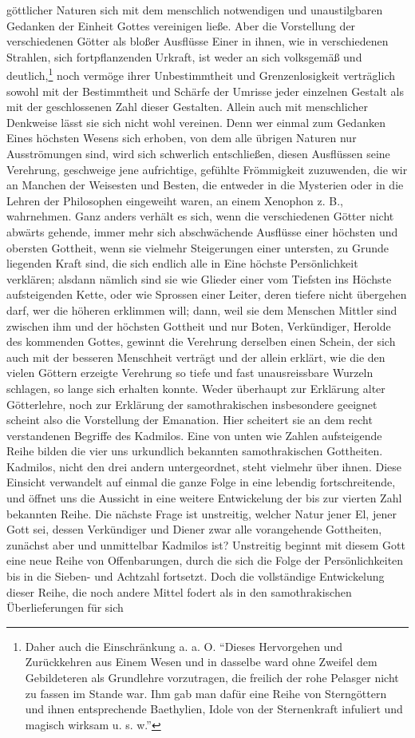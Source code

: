 \documentclass[a4paper, 11pt, oneside]{article}
\begin{document}
göttlicher Naturen sich mit dem menschlich notwendigen und unaustilgbaren Gedanken der Einheit Gottes vereinigen ließe. Aber die Vorstellung der verschiedenen Götter als bloßer Ausflüsse Einer in ihnen, wie in verschiedenen Strahlen, sich fortpflanzenden Urkraft, ist weder an sich volksgemäß und deutlich,\footnote{Daher auch die Einschränkung a. a. O. "`Dieses Hervorgehen und Zurückkehren aus Einem Wesen und in dasselbe ward ohne Zweifel dem Gebildeteren als Grundlehre vorzutragen, die freilich der rohe Pelasger nicht zu fassen im Stande war. Ihm gab man dafür eine Reihe von Sterngöttern und ihnen entsprechende Baethylien, Idole von der Sternenkraft infuliert und magisch wirksam u. s. w."'} noch vermöge ihrer Unbestimmtheit und Grenzenlosigkeit verträglich sowohl mit der Bestimmtheit und Schärfe der Umrisse jeder einzelnen Gestalt als mit der geschlossenen Zahl dieser Gestalten. Allein auch mit menschlicher Denkweise lässt sie sich nicht wohl vereinen. Denn wer einmal zum Gedanken Eines höchsten Wesens sich erhoben, von dem alle übrigen Naturen nur Ausströmungen sind, wird sich schwerlich entschließen, diesen Ausflüssen seine Verehrung, geschweige jene aufrichtige, gefühlte Frömmigkeit zuzuwenden, die wir an Manchen der Weisesten und Besten, die entweder in die Mysterien oder in die Lehren der Philosophen eingeweiht waren, an einem Xenophon z. B., wahrnehmen. Ganz anders verhält es sich, wenn die verschiedenen Götter nicht abwärts gehende, immer mehr sich abschwächende Ausflüsse einer höchsten und obersten Gottheit, wenn sie vielmehr Steigerungen einer untersten, zu Grunde liegenden Kraft sind, die sich endlich alle in Eine höchste Persönlichkeit verklären; alsdann nämlich sind sie wie Glieder einer vom Tiefsten ins Höchste aufsteigenden Kette, oder wie Sprossen einer Leiter, deren tiefere nicht übergehen darf, wer die höheren erklimmen will; dann, weil sie dem Menschen Mittler sind zwischen ihm und der höchsten Gottheit und nur Boten, Verkündiger, Herolde des kommenden Gottes, gewinnt die Verehrung derselben einen Schein, der sich auch mit der besseren Menschheit verträgt und der allein erklärt, wie die den vielen Göttern erzeigte Verehrung so tiefe und fast unausreissbare Wurzeln schlagen, so lange sich erhalten konnte. Weder überhaupt zur Erklärung alter Götterlehre, noch zur Erklärung der samothrakischen insbesondere geeignet scheint also die Vorstellung der Emanation. Hier scheitert sie an dem recht verstandenen Begriffe des Kadmilos. Eine von unten wie Zahlen aufsteigende Reihe bilden die vier uns urkundlich bekannten samothrakischen Gottheiten. Kadmilos, nicht den drei andern untergeordnet, steht vielmehr über ihnen. Diese Einsicht verwandelt auf einmal die ganze Folge in eine lebendig fortschreitende, und öffnet uns die Aussicht in eine weitere Entwickelung der bis zur vierten Zahl bekannten Reihe. Die nächste Frage ist unstreitig, welcher Natur jener El, jener Gott sei, dessen Verkündiger und Diener zwar alle vorangehende Gottheiten, zunächst aber und unmittelbar Kadmilos ist? Unstreitig beginnt mit diesem Gott eine neue Reihe von Offenbarungen, durch die sich die Folge der Persönlichkeiten bis in die Sieben- und Achtzahl fortsetzt. Doch die vollständige Entwickelung dieser Reihe, die noch andere Mittel fodert als in den samothrakischen Überlieferungen für sich 
\end{document}
